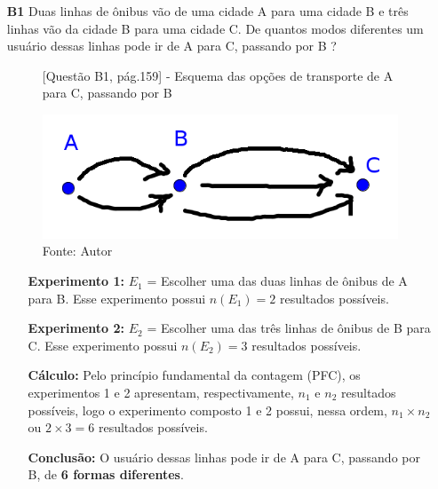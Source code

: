 \documentclass[a4paper,12pt]{article}
\begin{document}
\begin{enumerate}

\item[\textbf{B1}] Duas linhas de ônibus vão de uma cidade A para uma cidade B e três linhas vão da cidade B para uma cidade C. De quantos modos diferentes um usuário dessas linhas pode ir de A para C, passando por B ?

    \begin{figure}[htb]
      \centering
      \caption{[Questão B1, pág.159] - Esquema das opções de transporte de A para C, passando por B}
      \includegraphics[scale=0.6]{../../imagens/geogebra-cap21-exercicios-B1-pag159.png}
      \caption*{Fonte: Autor}
      \label{geogebra-cap21-exercicios-B1-pag159}
    \end{figure}

   \begin{itemize}
     \item[\ding{172}] \textbf{Experimento 1:} $E_1$ = Escolher uma das duas linhas de ônibus de A para B. Esse experimento possui $n(E_1) = 2$ resultados possíveis.
     \item[\ding{173}] \textbf{Experimento 2:} $E_2$ = Escolher uma das três linhas de ônibus de B para C. Esse experimento possui $n(E_2) = 3$ resultados possíveis.
     \item[\ding{174}] \textbf{Cálculo:} Pelo princípio fundamental da contagem (PFC), os experimentos 1 e 2 apresentam, respectivamente, $n_{1} \textrm{ e } n_{2}$ resultados possíveis, logo o experimento composto 1 e 2 possui, nessa ordem, $n_{1} \times n_{2}$ ou $2 \times 3 = 6$ resultados possíveis.
     \item[\ding{175}] \textbf{Conclusão:} O usuário dessas linhas pode ir de A para C, passando por B, de \textbf{6 formas diferentes}.   \end{itemize}
  

\end{enumerate}
\end{document}
